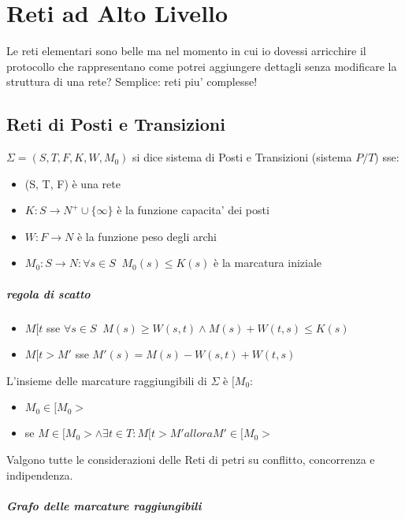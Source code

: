 \chapter{Reti ad Alto Livello}

Le reti elementari sono belle ma nel momento in cui io dovessi arricchire il protocollo che rappresentano come potrei aggiungere dettagli senza modificare la struttura di una rete?
Semplice: reti piu' complesse!

\section{Reti di Posti e Transizioni}

$\Sigma  = (S, T, F, K, W, M_0)$ si dice sistema di Posti e Transizioni (sistema $P/T$) sse:
\begin{itemize}
    \item (S, T, F) \`e una rete
    \item $K : S \rightarrow N^+ \cup \{\infty\}$ \`e la funzione capacita' dei posti
    \item $W : F \rightarrow N$ \`e la funzione peso degli archi
    \item $M_0 : S \rightarrow N : \forall s \in S \;\; M_0(s) \leq K(s)$ \`e la marcatura iniziale
\end{itemize}

\paragraph{regola di scatto}

\begin{itemize}
    \item $M[t$ sse $\forall s \in S \;\; M(s) \geq W(s, t) \land M(s) + W(t, s) \leq K(s)$
    \item $M[t > M'$ sse $M'(s) = M(s) - W(s, t) + W(t, s)$
\end{itemize}

L'insieme delle marcature raggiungibili di $\Sigma$ \`e $[M_0$:
\begin{itemize}
    \item $M_0 \in [M_0 >$
    \item se $M \in [M_0 > \land \exists t \in T : M[t > M' allora M' \in [M_0 >$
\end{itemize}

Valgono tutte le considerazioni delle Reti di petri su conflitto, concorrenza e indipendenza.

\paragraph{Grafo delle marcature raggiungibili}

